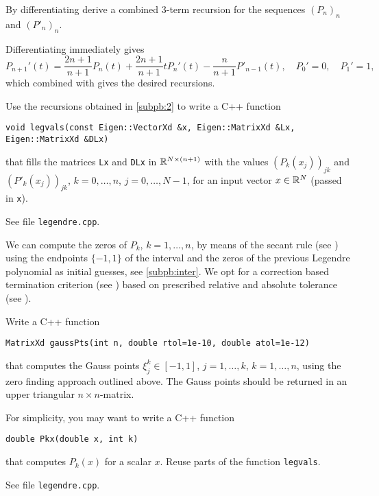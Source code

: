 \begin{problem}
\begin{subproblem}[1]\label{subpb:2}
By differentiating  derive a combined 3-term recursion for the sequences $(P_n)_n$ and $(P'_n)_n$.
\begin{solution}
Differentiating  immediately gives
\begin{equation*}
P_{n+1}'(t)=\frac{2n+1}{n+1}P_n(t) + \frac{2n+1}{n+1} t P_n'(t)-\frac{n}{n+1}P'_{n-1}(t),\quad P_0'=0,\quad P_1'=1,
\end{equation*}
which combined with  gives the desired recursions.
\end{solution}
\end{subproblem}

\begin{subproblem}[2]
Use the recursions obtained in \ref{subpb:2} to write a C++ function
\begin{lstlisting}
void legvals(const Eigen::VectorXd &x, Eigen::MatrixXd &Lx, Eigen::MatrixXd &DLx)
\end{lstlisting}
that fills the matrices \texttt{Lx} and \texttt{DLx} in $\mathbb{R}^{N\times (n+1)}$ with the values $(P_k(x_j))_{jk}$ and $(P'_k(x_j))_{jk}$, $k=0,\dots,n$, $j=0,\dots,N-1$, for an input vector $x\in \mathbb{R}^N$ (passed in \texttt{x}).
\begin{solution}
See file \texttt{legendre.cpp}.
\end{solution}
\end{subproblem}

\begin{subproblem}[3]
We can compute the zeros of $P_k$, $k=1,\dots,n$, by means of the secant rule (see ) using the endpoints $\{-1,1\}$ of the interval and the zeros of the previous Legendre polynomial as initial guesses, see \ref{subpb:inter}. We opt for a correction based termination criterion (see ) based on prescribed relative and absolute tolerance (see ).

Write a C++ function
\begin{lstlisting}
MatrixXd gaussPts(int n, double rtol=1e-10, double atol=1e-12)
\end{lstlisting}
that computes the Gauss points $\xi^k_j\in [-1,1]$, $j=1,\dots,k$, $k=1,\dots,n$, using the zero finding approach outlined above. The Gauss points should be returned in  an upper triangular $n\times n$-matrix.
\begin{hint}
For simplicity, you may want to write a C++ function
\begin{lstlisting}
double Pkx(double x, int k)
\end{lstlisting}
that computes $P_k(x)$ for a scalar $x$. Reuse parts of the function \texttt{legvals}.
\end{hint}
\begin{solution}
See file \texttt{legendre.cpp}.
\end{solution}
\end{subproblem}


\end{problem}
